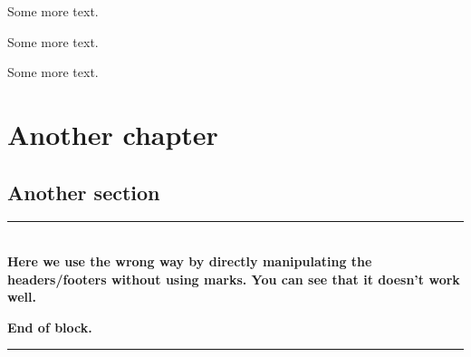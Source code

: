 \documentclass[openany]{book}
\begin{document}
Some more text.

Some more text.

Some more text.

\chapter{Another chapter}

\label{cha:another-chapter}

\lipsum[2]

\section{Another section}

\lipsum[3-4]

\noindent\rule{\textwidth}{1mm}\\
\textbf{Here we use the wrong way by directly manipulating the headers/footers without using marks. You can see that it doesn't work well.}

\lipsum[5]

\textbf{End of block.}\\
\noindent\rule{\textwidth}{1mm}\\
\fancyhead[L]{}
\fancyfoot[R]{}
\end{document}
